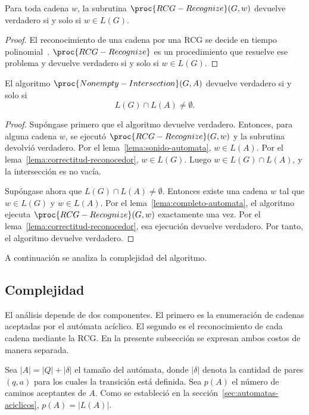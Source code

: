 \begin{lema}
\label{lema:correctitud-reconocedor}
Para toda cadena $w$, la subrutina $\proc{RCG-Recognize}(G,w)$ devuelve
verdadero si y solo si $w \in L(G)$.
\end{lema}

\begin{proof}
El reconocimiento de una cadena por una RCG se decide en tiempo
polinomial~\cite{boullier1998proposal,kallmeyer2010parsing}. $\proc{RCG-Recognize}$
es un procedimiento que resuelve ese problema y devuelve verdadero si
y solo si $w \in L(G)$.
\end{proof}

\begin{teorema}
\label{teo:correctitud-enumeracion}
El algoritmo $\proc{Nonempty-Intersection}(G,A)$ devuelve
verdadero si y solo si
\[
  L(G) \cap L(A) \neq \emptyset.
\]
\end{teorema}

\begin{proof}
Supóngase primero que el algoritmo devuelve verdadero. Entonces, para
alguna cadena $w$, se ejecutó $\proc{RCG-Recognize}(G,w)$ y la subrutina
devolvió verdadero. Por el lema~\ref{lema:sonido-automata},
$w \in L(A)$. Por el lema~\ref{lema:correctitud-reconocedor},
$w \in L(G)$. Luego $w \in L(G) \cap L(A)$, y la intersección es no
vacía.

Supóngase ahora que $L(G) \cap L(A) \neq \emptyset$. Entonces existe una
cadena $w$ tal que $w \in L(G)$ y $w \in L(A)$. Por el
lema~\ref{lema:completo-automata}, el algoritmo ejecuta
$\proc{RCG-Recognize}(G,w)$ exactamente una vez. Por el
lema~\ref{lema:correctitud-reconocedor}, esa ejecución devuelve
verdadero. Por tanto, el algoritmo devuelve verdadero.
\end{proof}

A continuación se analiza la complejidad del algoritmo.

\subsection{Complejidad}
\label{sec:complejidad-algoritmo}

El análisis depende de dos componentes. El primero es
la enumeración de cadenas aceptadas por el autómata acíclico. El
segundo es el reconocimiento de cada cadena mediante
la RCG. En la presente subsección se expresan ambos costos de manera
separada.

Sea $|A|=|Q|+|\delta|$ el tamaño del autómata, donde $|\delta|$ denota
la cantidad de pares $(q,a)$ para los cuales la transición está definida.
Sea $p(A)$ el número de caminos aceptantes de $A$. Como se estableció
en la sección~\ref{sec:automatas-aciclicos}, $p(A)=|L(A)|$.

